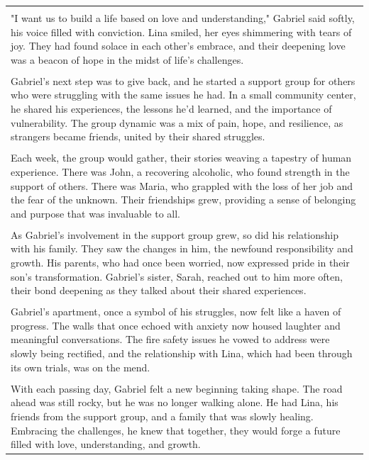 \begin{small}
\begin{longtable}{p{}}
\\
\\
"I want us to build a life based on love and understanding," Gabriel said softly, his voice filled with conviction. Lina smiled, her eyes shimmering with tears of joy. They had found solace in each other's embrace, and their deepening love was a beacon of hope in the midst of life's challenges.
\\
\\
Gabriel's next step was to give back, and he started a support group for others who were struggling with the same issues he had. In a small community center, he shared his experiences, the lessons he'd learned, and the importance of vulnerability. The group dynamic was a mix of pain, hope, and resilience, as strangers became friends, united by their shared struggles.
\\
\\
Each week, the group would gather, their stories weaving a tapestry of human experience. There was John, a recovering alcoholic, who found strength in the support of others. There was Maria, who grappled with the loss of her job and the fear of the unknown. Their friendships grew, providing a sense of belonging and purpose that was invaluable to all.
\\
\\
As Gabriel's involvement in the support group grew, so did his relationship with his family. They saw the changes in him, the newfound responsibility and growth. His parents, who had once been worried, now expressed pride in their son's transformation. Gabriel's sister, Sarah, reached out to him more often, their bond deepening as they talked about their shared experiences.
\\
\\
Gabriel's apartment, once a symbol of his struggles, now felt like a haven of progress. The walls that once echoed with anxiety now housed laughter and meaningful conversations. The fire safety issues he vowed to address were slowly being rectified, and the relationship with Lina, which had been through its own trials, was on the mend.
\\
\\
With each passing day, Gabriel felt a new beginning taking shape. The road ahead was still rocky, but he was no longer walking alone. He had Lina, his friends from the support group, and a family that was slowly healing. Embracing the challenges, he knew that together, they would forge a future filled with love, understanding, and growth.
\\

\end{longtable}
\end{small}
